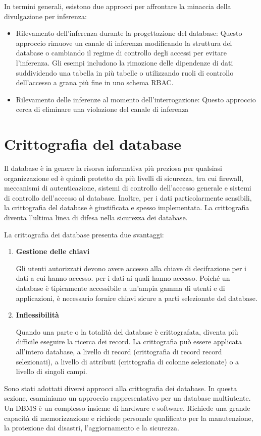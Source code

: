 \singlespacing

In termini generali, esistono due approcci per affrontare la minaccia della divulgazione per inferenza:

\begin{itemize}
    \item Rilevamento dell'inferenza durante la progettazione del database: Questo approccio rimuove un canale di inferenza modificando la struttura del database o cambiando il regime di controllo degli accessi per evitare l'inferenza.  Gli esempi includono la rimozione delle dipendenze di dati suddividendo una tabella in più tabelle o utilizzando ruoli di controllo dell'accesso a grana più fine in uno schema RBAC.

    \item Rilevamento delle inferenze al momento dell'interrogazione: Questo approccio cerca di eliminare una violazione del canale di inferenza
\end{itemize}
\newpage
\section{Crittografia del database}
Il database è in genere la risorsa informativa più preziosa per qualsiasi organizzazione ed è quindi protetto da più livelli di sicurezza, tra cui firewall, meccanismi di autenticazione, sistemi di controllo dell'accesso generale e sistemi di controllo dell'accesso al database. Inoltre, per i dati particolarmente sensibili, la crittografia del database è giustificata e spesso implementata. La crittografia diventa l'ultima linea di difesa nella sicurezza dei database.

\singlespacing

La crittografia dei database presenta due svantaggi:

\begin{enumerate}
    \item \textbf{Gestione delle chiavi}
    
    Gli utenti autorizzati devono avere accesso alla chiave di decifrazione per i dati a cui hanno accesso. per i dati ai quali hanno accesso. Poiché un database è tipicamente accessibile a un'ampia gamma di utenti e di applicazioni, è necessario fornire chiavi sicure a parti selezionate del database. 
    
    \item \textbf{Inflessibilità}
    
    Quando una parte o la totalità del database è crittografata, diventa più difficile eseguire la ricerca dei record. La crittografia può essere applicata all'intero database, a livello di record (crittografia di record record selezionati), a livello di attributi (crittografia di colonne selezionate) o a livello di singoli campi.
    
\end{enumerate}
Sono stati adottati diversi approcci alla crittografia dei database. In questa sezione, esaminiamo un approccio rappresentativo per un database multiutente. Un DBMS è un complesso insieme di hardware e software. Richiede una grande
capacità di memorizzazione e richiede personale qualificato per la manutenzione, la protezione dai disastri, l'aggiornamento e la sicurezza.

